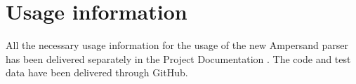 
\section{Usage information}
All the necessary usage information for the usage of the new Ampersand parser has been delivered separately in the Project Documentation .
The code and test data have been delivered through GitHub.
